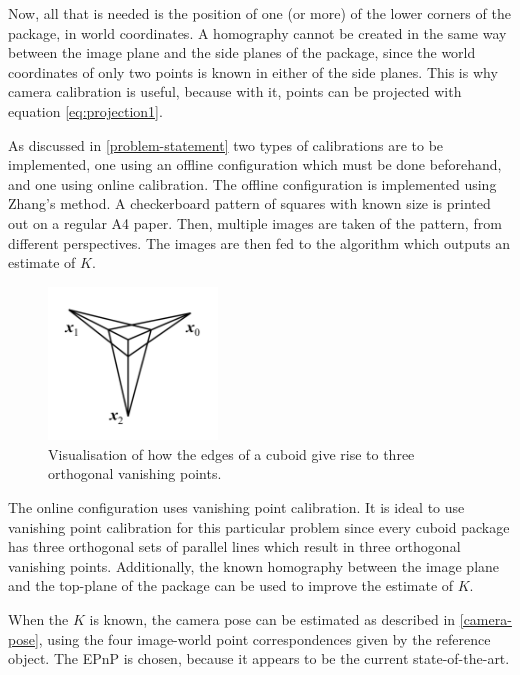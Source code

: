 Now, all that is needed is the position of one (or more) of the lower corners of the package, in world coordinates.
A homography cannot be created in the same way between the image plane and the side planes of the package, since the world coordinates of only two points is known in either of the side planes.
This is why camera calibration is useful, because with it, points can be projected with equation \ref{eq:projection1}.

As discussed in \ref{problem-statement} two types of calibrations are to be implemented, one using an offline configuration which must be done beforehand, and one using online calibration.
The offline configuration is implemented using Zhang's method.
A checkerboard pattern of squares with known size is printed out on a regular A4 paper.
Then, multiple images are taken of the pattern, from different perspectives. 
The images are then fed to the algorithm which outputs an estimate of $K$.%

\begin{figure}[h]
\begin{center}
\includegraphics[width=0.4\textwidth]{figures/vanishing_points.png}
\end{center} %
\caption{Visualisation of how the edges of a cuboid give rise to three orthogonal vanishing points.} %
\label{fig:vanishing_points}
\end{figure}

The online configuration uses vanishing point calibration.
It is ideal to use vanishing point calibration for this particular problem since every cuboid package has three orthogonal sets of parallel lines which result in three orthogonal vanishing points.
Additionally, the known homography between the image plane and the top-plane of the package can be used to improve the estimate of $K$.

When the $K$ is known, the camera pose can be estimated as described in \ref{camera-pose}, using the four image-world point correspondences given by the reference object.
The EPnP is chosen, because it appears to be the current state-of-the-art. %

